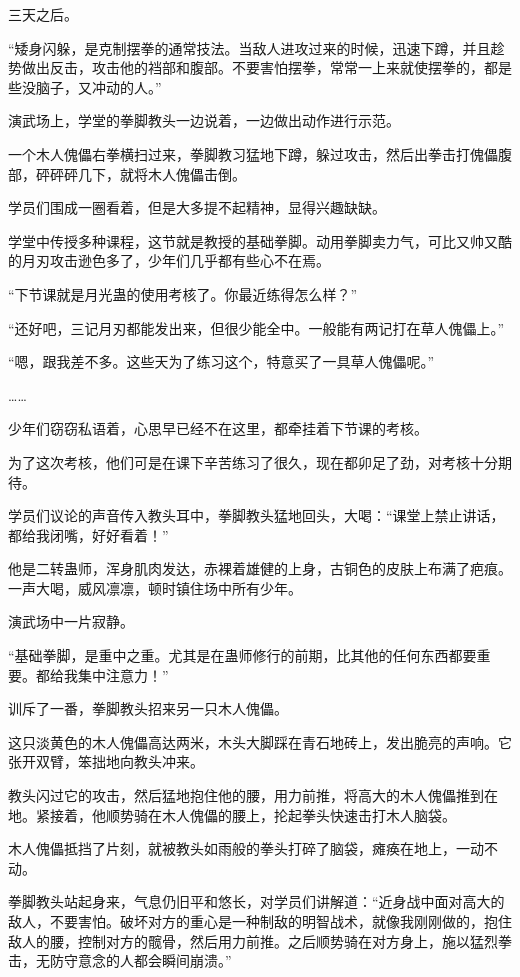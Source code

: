 
\begin{this_body}

三天之后。

“矮身闪躲，是克制摆拳的通常技法。当敌人进攻过来的时候，迅速下蹲，并且趁势做出反击，攻击他的裆部和腹部。不要害怕摆拳，常常一上来就使摆拳的，都是些没脑子，又冲动的人。”

演武场上，学堂的拳脚教头一边说着，一边做出动作进行示范。

一个木人傀儡右拳横扫过来，拳脚教习猛地下蹲，躲过攻击，然后出拳击打傀儡腹部，砰砰砰几下，就将木人傀儡击倒。

学员们围成一圈看着，但是大多提不起精神，显得兴趣缺缺。

学堂中传授多种课程，这节就是教授的基础拳脚。动用拳脚卖力气，可比又帅又酷的月刃攻击逊色多了，少年们几乎都有些心不在焉。

“下节课就是月光蛊的使用考核了。你最近练得怎么样？”

“还好吧，三记月刃都能发出来，但很少能全中。一般能有两记打在草人傀儡上。”

“嗯，跟我差不多。这些天为了练习这个，特意买了一具草人傀儡呢。”

……

少年们窃窃私语着，心思早已经不在这里，都牵挂着下节课的考核。

为了这次考核，他们可是在课下辛苦练习了很久，现在都卯足了劲，对考核十分期待。

学员们议论的声音传入教头耳中，拳脚教头猛地回头，大喝：“课堂上禁止讲话，都给我闭嘴，好好看着！”

他是二转蛊师，浑身肌肉发达，赤裸着雄健的上身，古铜色的皮肤上布满了疤痕。一声大喝，威风凛凛，顿时镇住场中所有少年。

演武场中一片寂静。

“基础拳脚，是重中之重。尤其是在蛊师修行的前期，比其他的任何东西都要重要。都给我集中注意力！”

训斥了一番，拳脚教头招来另一只木人傀儡。

这只淡黄色的木人傀儡高达两米，木头大脚踩在青石地砖上，发出脆亮的声响。它张开双臂，笨拙地向教头冲来。

教头闪过它的攻击，然后猛地抱住他的腰，用力前推，将高大的木人傀儡推到在地。紧接着，他顺势骑在木人傀儡的腰上，抡起拳头快速击打木人脑袋。

木人傀儡抵挡了片刻，就被教头如雨般的拳头打碎了脑袋，瘫痪在地上，一动不动。

拳脚教头站起身来，气息仍旧平和悠长，对学员们讲解道：“近身战中面对高大的敌人，不要害怕。破坏对方的重心是一种制敌的明智战术，就像我刚刚做的，抱住敌人的腰，控制对方的髋骨，然后用力前推。之后顺势骑在对方身上，施以猛烈拳击，无防守意念的人都会瞬间崩溃。”


\end{this_body}

